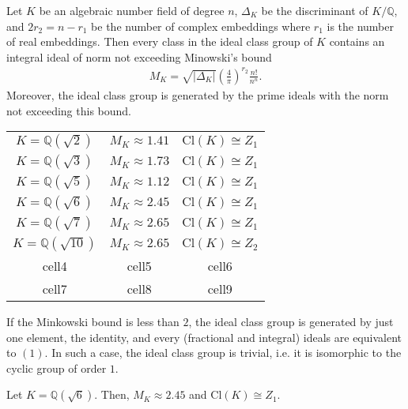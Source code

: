 \begin{thmbox}
    \begin{theorem}
        Let \(K\) be an algebraic number field of degree \(n\), \(\Delta_K\) be the discriminant of \(K / \mathbb{Q}\), and \(2 r_2 = n - r_1\) be the number of complex embeddings where \(r_1\) is the number of real embeddings. Then every class in the ideal class group of \(K\) contains an integral ideal of norm not exceeding Minowski's bound
        \begin{align*}
            M_K = \sqrt{|\Delta_K|} \left( \frac{4}{\pi} \right)^{r_2} \frac{n!}{n^n} \text{.}
        \end{align*}
        Moreover, the ideal class group is generated by the prime ideals with the norm not exceeding this bound.
    \end{theorem}
\end{thmbox}

\begin{center}
    \begin{tabular}{ c c c }
     \(K = \mathbb{Q}(\sqrt{2})\) & \(M_K \approx 1.41\) & \(\mathrm{Cl}(K) \cong Z_1 \) \\
     \(K = \mathbb{Q}(\sqrt{3})\) & \(M_K \approx 1.73\) & \(\mathrm{Cl}(K) \cong Z_1 \) \\
     \(K = \mathbb{Q}(\sqrt{5})\) & \(M_K \approx 1.12\) & \(\mathrm{Cl}(K) \cong Z_1 \) \\
     \(K = \mathbb{Q}(\sqrt{6})\) & \(M_K \approx 2.45\) & \(\mathrm{Cl}(K) \cong Z_1\) \\ 
     \(K = \mathbb{Q}(\sqrt{7})\) & \(M_K \approx 2.65\) & \(\mathrm{Cl}(K) \cong Z_1 \) \\
     \(K = \mathbb{Q}(\sqrt{10})\) & \(M_K \approx 2.65\) & \(\mathrm{Cl}(K) \cong Z_2 \) \\ 
     cell4 & cell5 & cell6 \\  
     cell7 & cell8 & cell9    
    \end{tabular}
    \end{center}

\begin{example}
    If the Minkowski bound is less than \(2\), the ideal class group is generated by just one element, the identity, and every (fractional and integral) ideals are equivalent to \((1)\). In such a case, the ideal class group is trivial, i.e. it is isomorphic to the cyclic group of order \(1\).
\end{example}

\begin{example}
    Let \(K = \mathbb{Q}(\sqrt{6})\). Then, \(M_K \approx 2.45\) and \(\mathrm{Cl}(K) \cong Z_1\).
\end{example}


